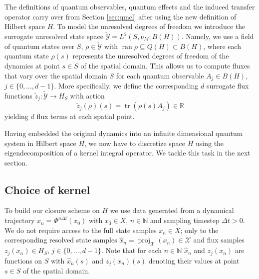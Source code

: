 \documentclass[letterpaper,10pt,3p,preprint]{elsarticle}
\newcommand{\Nbb}{\mathbb{N}}
\newcommand{\Rbb}{\mathbb{R}}
\newcommand{\Ycal}{\mathcal{Y}}
\DeclareMathOperator{\ran}{ran}
\DeclareMathOperator{\tr}{tr}
\DeclareMathOperator{\proj}{proj}
\begin{document}
The definitions of quantum observables, quantum effects
and the induced transfer operator carry over from
Section \ref{sec:qmcl}
after using the new definition of Hilbert space $H$.
To model the unresolved degrees of freedom we introduce the
surrogate unresolved state space
$\tilde{\Ycal}=L^2(S,\nu_M;B(H))$.
Namely, we use a field of quantum states over $S$,
$\rho\in\tilde{\Ycal}$ with
$\ran{\rho}\subseteq Q(H)\subset B(H)$,
where each quantum state $\rho(s)$ represents the unresolved
degrees of freedom of the dynamics at point $s\in S$
of the spatial domain.
This allows us to compute fluxes that vary over the spatial
domain $S$ for each quantum observable
$A_j\in B(H)$, $j\in\{0,\ldots,d-1\}$.
More specifically, we define the corresponding
$d$ surrogate flux functions
$\tilde{z}_j\colon\tilde{\Ycal}\to H_S$
with action
\begin{equation*}
\tilde{z}_j(\rho)(s)=\tr(\rho(s)A_j)\in\Rbb
\end{equation*}
yielding $d$ flux terms at each spatial point.

Having embedded the original dynamics into an infinite dimensional
quantum system in Hilbert space $H$, we now have to discretize
space $H$ using the eigendecomposition of a kernel integral operator.
We tackle this task in the next section.

\subsection{Choice of kernel}\label{sec:kernel-choice}
To build our closure scheme on $H$ we use data generated from
a dynamical trajectory
$x_n=\Phi^{n\Delta t}(x_0)$ with $x_0\in X$, $n\in\Nbb$
and sampling timestep $\Delta t>0$.
We do not require access to the full state samples $x_n\in X$;
only to the corresponding resolved state samples
$\hat{x}_n=\proj_\mathcal{X}(x_n)\in\mathcal{X}$
and flux samples
$z_j(x_n)\in H_S$, $j\in\{0,\ldots,d-1\}$.
Note that for each $n\in\Nbb$
$\hat{x}_n$ and $z_j(x_n)$ are functions on $S$
with $\hat{x}_n(s)$ and $z_j(x_n)(s)$
denoting their values at point $s\in S$ of the spatial domain.
\end{document}
